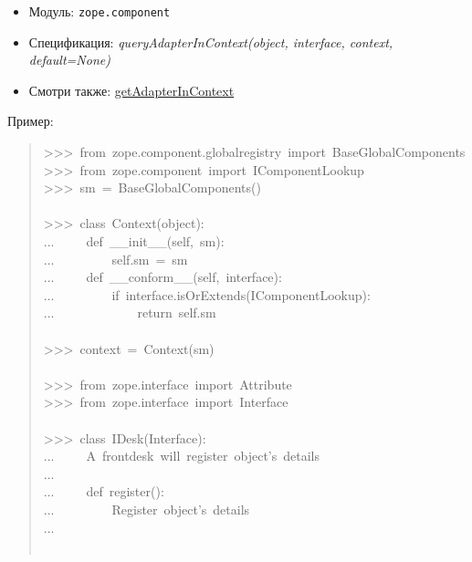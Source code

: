 \documentclass[a4paper,openany,twoside,final]{book}
\providecommand*{\DUroletitlereference}[1]{\textsl{#1}}
\begin{document}
\begin{itemize}

\item Модуль: \texttt{zope.component}

\item Спецификация: \DUroletitlereference{queryAdapterInContext(object, interface, context,
default=None)}

\item Смотри также: \hyperref[getadapterincontext]{getAdapterInContext}

\end{itemize}

Пример:

\begin{quote}{\ttfamily \raggedright \noindent
>{}>{}>~from~zope.component.globalregistry~import~BaseGlobalComponents\\
>{}>{}>~from~zope.component~import~IComponentLookup\\
>{}>{}>~sm~=~BaseGlobalComponents()\\
~\\
>{}>{}>~class~Context(object):\\
...~~~~~def~\_\_init\_\_(self,~sm):\\
...~~~~~~~~~self.sm~=~sm\\
...~~~~~def~\_\_conform\_\_(self,~interface):\\
...~~~~~~~~~if~interface.isOrExtends(IComponentLookup):\\
...~~~~~~~~~~~~~return~self.sm\\
~\\
>{}>{}>~context~=~Context(sm)\\
~\\
>{}>{}>~from~zope.interface~import~Attribute\\
>{}>{}>~from~zope.interface~import~Interface\\
~\\
>{}>{}>~class~IDesk(Interface):\\
...~~~~~\textquotedbl{}\textquotedbl{}\textquotedbl{}A~frontdesk~will~register~object's~details\textquotedbl{}\textquotedbl{}\textquotedbl{}\\
...\\
...~~~~~def~register():\\
...~~~~~~~~~\textquotedbl{}\textquotedbl{}\textquotedbl{}Register~object's~details\textquotedbl{}\textquotedbl{}\textquotedbl{}\\
...\\
~\\
}
\end{quote}
\end{document}
